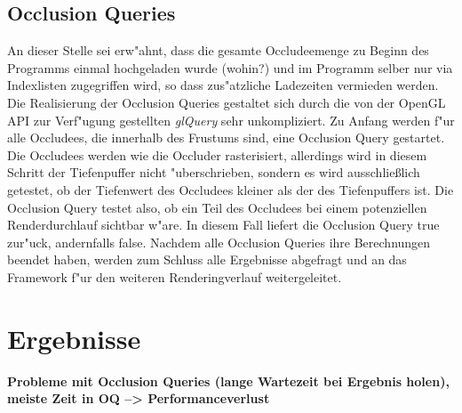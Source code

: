 \documentclass[journal]{vgtc}
\begin{document}
\subsection{Occlusion Queries}
An dieser Stelle sei erw"ahnt, dass die gesamte Occludeemenge zu Beginn des Programms einmal hochgeladen wurde (wohin?) und im Programm selber nur via Indexlisten zugegriffen wird, so dass zus"atzliche Ladezeiten vermieden werden. Die Realisierung der Occlusion Queries gestaltet sich durch die von der OpenGL API zur Verf"ugung gestellten \textit{glQuery} sehr unkompliziert. Zu Anfang werden f"ur alle Occludees, die innerhalb des Frustums sind, eine Occlusion Query gestartet. Die Occludees werden wie die Occluder rasterisiert, allerdings wird in diesem Schritt der Tiefenpuffer nicht "uberschrieben, sondern es wird ausschlie{\ss}lich getestet, ob der Tiefenwert des Occludees kleiner als der des Tiefenpuffers ist. Die Occlusion Query testet also, ob ein Teil des Occludees bei einem potenziellen Renderdurchlauf sichtbar w"are. In diesem Fall liefert die Occlusion Query \glqq true\grqq{} zur"uck, andernfalls \glqq false\grqq{}. Nachdem alle Occlusion Queries ihre Berechnungen beendet haben, werden zum Schluss alle Ergebnisse abgefragt und an das Framework f"ur den weiteren Renderingverlauf weitergeleitet.


\section{Ergebnisse}
\textbf{Probleme mit Occlusion Queries (lange Wartezeit bei Ergebnis holen), meiste Zeit in OQ --> Performanceverlust}
\end{document}
